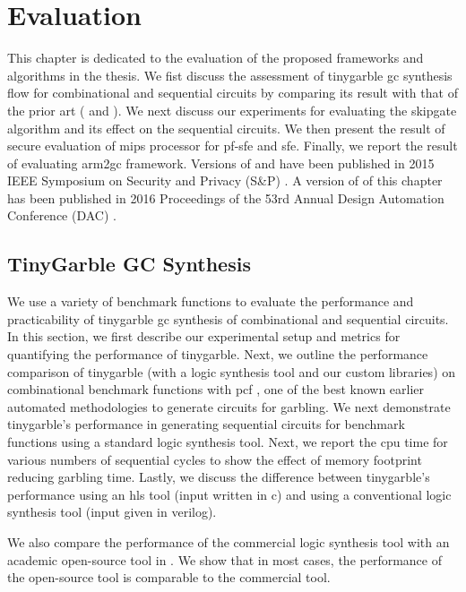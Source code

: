 \chapter{Evaluation}\label{chap:eval}
This chapter is dedicated to the evaluation of the proposed frameworks and algorithms in the thesis.
We fist discuss the assessment of \gls{tinygarble} \acrfull{gc} synthesis flow for combinational and sequential circuits by comparing its result with that of the prior art ( and ).
We next discuss our experiments for evaluating the \gls{skipgate} algorithm and its effect on the sequential circuits.
We then present the result of secure evaluation of \gls{mips} processor for \acrfull{pf-sfe} and \acrfull{sfe}.
Finally, we report the result of evaluating \gls{arm2gc} framework.
Versions of  and  have been published in 2015 IEEE Symposium on Security and Privacy (S\&P) \cite{songhori2015tinygarble}.
A version of  of this chapter has been published in 2016 Proceedings of the 53rd Annual Design Automation Conference (DAC) \cite{songhori2016garbledcpu}.

\section{TinyGarble GC Synthesis}\label{sec:eval-tinygarble}
We use a variety of benchmark functions to evaluate the performance and practicability of \gls{tinygarble} \acrshort{gc} synthesis of combinational and sequential circuits.
In this section, we first describe our experimental setup and metrics for quantifying the performance of \gls{tinygarble}.
Next, we outline the performance comparison of \gls{tinygarble} (with a logic synthesis tool and our custom libraries) on combinational benchmark functions with \gls{pcf} \cite{kreuter2013pcf}, one of the best known earlier automated methodologies to generate circuits for garbling.
We next demonstrate \gls{tinygarble}'s performance in generating sequential circuits for benchmark functions using a standard logic synthesis tool.
Next, we report the \acrshort{cpu} time for various numbers of sequential cycles to show the effect of memory footprint reducing garbling time.
Lastly, we discuss the difference between \gls{tinygarble}'s performance using an \acrfull{hls} tool (input written in \gls{c}) and using a conventional logic synthesis tool (input given in \gls{verilog}).

We also compare the performance of the commercial logic synthesis tool with an academic open-source tool in .
We show that in most cases, the performance of the open-source tool is comparable to the commercial tool.

